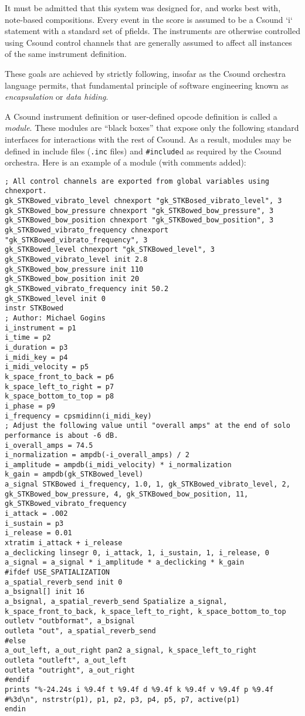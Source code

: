 \documentclass[12pt,letterpaper,onecolumn]{scrartcl}
\begin{document}
It must be admitted that this system was designed for, and works best with,
note-based compositions. Every event in the score is assumed to be a Csound
`i` statement with a standard set of pfields. The instruments are otherwise
controlled using Csound control channels that are generally assumed to affect
all instances of the same instrument definition.

These goals are achieved by strictly following, insofar as the
Csound orchestra language permits, that fundamental principle of software
engineering known as \emph{encapsulation} or \emph{data hiding}.

A Csound instrument definition or user-defined opcode definition is called a
\emph{module}. These modules are ``black boxes'' that expose only the following
standard interfaces for interactions with the rest of Csound. As a result,
modules may be defined in include files (\texttt{.inc} files) and
\texttt{\#include}d as required by the Csound orchestra. Here is an example of
a module (with comments added):

\begin{lstlisting}
; All control channels are exported from global variables using chnexport.
gk_STKBowed_vibrato_level chnexport "gk_STKBosed_vibrato_level", 3
gk_STKBowed_bow_pressure chnexport "gk_STKBowed_bow_pressure", 3
gk_STKBowed_bow_position chnexport "gk_STKBowed_bow_position", 3
gk_STKBowed_vibrato_frequency chnexport "gk_STKBowed_vibrato_frequency", 3
gk_STKBowed_level chnexport "gk_STKBowed_level", 3
gk_STKBowed_vibrato_level init 2.8
gk_STKBowed_bow_pressure init 110
gk_STKBowed_bow_position init 20
gk_STKBowed_vibrato_frequency init 50.2
gk_STKBowed_level init 0
instr STKBowed
; Author: Michael Gogins
i_instrument = p1
i_time = p2
i_duration = p3
i_midi_key = p4
i_midi_velocity = p5
k_space_front_to_back = p6
k_space_left_to_right = p7
k_space_bottom_to_top = p8
i_phase = p9
i_frequency = cpsmidinn(i_midi_key)
; Adjust the following value until "overall amps" at the end of solo performance is about -6 dB.
i_overall_amps = 74.5
i_normalization = ampdb(-i_overall_amps) / 2
i_amplitude = ampdb(i_midi_velocity) * i_normalization
k_gain = ampdb(gk_STKBowed_level)
a_signal STKBowed i_frequency, 1.0, 1, gk_STKBowed_vibrato_level, 2, gk_STKBowed_bow_pressure, 4, gk_STKBowed_bow_position, 11, gk_STKBowed_vibrato_frequency
i_attack = .002
i_sustain = p3
i_release = 0.01
xtratim i_attack + i_release
a_declicking linsegr 0, i_attack, 1, i_sustain, 1, i_release, 0
a_signal = a_signal * i_amplitude * a_declicking * k_gain 
#ifdef USE_SPATIALIZATION
a_spatial_reverb_send init 0
a_bsignal[] init 16
a_bsignal, a_spatial_reverb_send Spatialize a_signal, k_space_front_to_back, k_space_left_to_right, k_space_bottom_to_top
outletv "outbformat", a_bsignal
outleta "out", a_spatial_reverb_send
#else
a_out_left, a_out_right pan2 a_signal, k_space_left_to_right
outleta "outleft", a_out_left
outleta "outright", a_out_right
#endif
prints "%-24.24s i %9.4f t %9.4f d %9.4f k %9.4f v %9.4f p %9.4f #%3d\n", nstrstr(p1), p1, p2, p3, p4, p5, p7, active(p1)
endin
\end{lstlisting}
\end{document}
